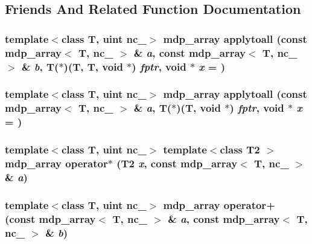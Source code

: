 \subsection{Friends And Related Function Documentation}
\hypertarget{classmdp__array_af47ee2aa085a0ca303f6eb960be0b257}{
\subsubsection[{applytoall}]{\setlength{\rightskip}{0pt plus 5cm}template$<$class T, uint nc\_\-$>$ {\bf mdp\_\-array} applytoall (const {\bf mdp\_\-array}$<$ T, nc\_\- $>$ \& {\em a}, \/  const {\bf mdp\_\-array}$<$ T, nc\_\- $>$ \& {\em b}, \/  T($\ast$)(T, T, void $\ast$) {\em fptr}, \/  void $\ast$ {\em x} = {})}}
\label{classmdp__array_af47ee2aa085a0ca303f6eb960be0b257}
\hypertarget{classmdp__array_a720a0f3e6c74893b0bb90ddb85e2c7cf}{
\subsubsection[{applytoall}]{\setlength{\rightskip}{0pt plus 5cm}template$<$class T, uint nc\_\-$>$ {\bf mdp\_\-array} applytoall (const {\bf mdp\_\-array}$<$ T, nc\_\- $>$ \& {\em a}, \/  T($\ast$)(T, void $\ast$) {\em fptr}, \/  void $\ast$ {\em x} = {})}}
\label{classmdp__array_a720a0f3e6c74893b0bb90ddb85e2c7cf}
\hypertarget{classmdp__array_a153656d696c7d05f5e61deb324e93132}{
\subsubsection[{operator$\ast$}]{\setlength{\rightskip}{0pt plus 5cm}template$<$class T, uint nc\_\-$>$ template$<$class T2 $>$ {\bf mdp\_\-array} operator$\ast$ (T2 {\em x}, \/  const {\bf mdp\_\-array}$<$ T, nc\_\- $>$ \& {\em a})}}
\label{classmdp__array_a153656d696c7d05f5e61deb324e93132}
\hypertarget{classmdp__array_a0456c0c6d5e305cc0799ceb7b8639539}{
\subsubsection[{operator+}]{\setlength{\rightskip}{0pt plus 5cm}template$<$class T, uint nc\_\-$>$ {\bf mdp\_\-array} operator+ (const {\bf mdp\_\-array}$<$ T, nc\_\- $>$ \& {\em a}, \/  const {\bf mdp\_\-array}$<$ T, nc\_\- $>$ \& {\em b})}}
